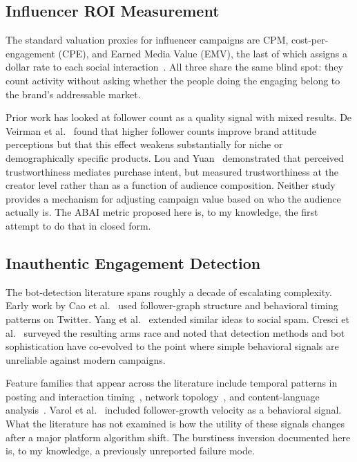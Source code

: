 \documentclass[conference]{IEEEtran}
\begin{document}
\subsection{Influencer ROI Measurement}

The standard valuation proxies for influencer campaigns are CPM, cost-per-engagement
(CPE), and Earned Media Value (EMV), the last of which assigns a dollar rate to
each social interaction~\cite{freberg2011}. All three share the same blind spot:
they count activity without asking whether the people doing the engaging belong
to the brand's addressable market.

Prior work has looked at follower count as a quality signal with mixed results.
De Veirman et al.~\cite{deveirman2017} found that higher follower counts
improve brand attitude perceptions but that this effect weakens substantially
for niche or demographically specific products. Lou and Yuan~\cite{lou2019}
demonstrated that perceived trustworthiness mediates purchase intent, but
measured trustworthiness at the creator level rather than as a function of
audience composition. Neither study provides a mechanism for adjusting campaign
value based on who the audience actually is. The ABAI metric proposed here
is, to my knowledge, the first attempt to do that in closed form.

\subsection{Inauthentic Engagement Detection}

The bot-detection literature spans roughly a decade of escalating complexity.
Early work by Cao et al.~\cite{cao2012} used follower-graph structure and
behavioral timing patterns on Twitter. Yang et al.~\cite{yang2014} extended
similar ideas to social spam. Cresci et al.~\cite{cresci2020} surveyed the
resulting arms race and noted that detection methods and bot
sophistication have co-evolved to the point where simple behavioral signals
are unreliable against modern campaigns.

Feature families that appear across the literature include temporal patterns
in posting and interaction timing~\cite{cao2012,ferrara2016}, network
topology~\cite{yang2014,bessi2016}, and content-language
analysis~\cite{cresci2020}. Varol et al.~\cite{varol2017} included
follower-growth velocity as a behavioral signal. What the literature has not
examined is how the utility of these signals changes after a major platform
algorithm shift. The burstiness inversion documented here is, to my
knowledge, a previously unreported failure mode.
\end{document}
